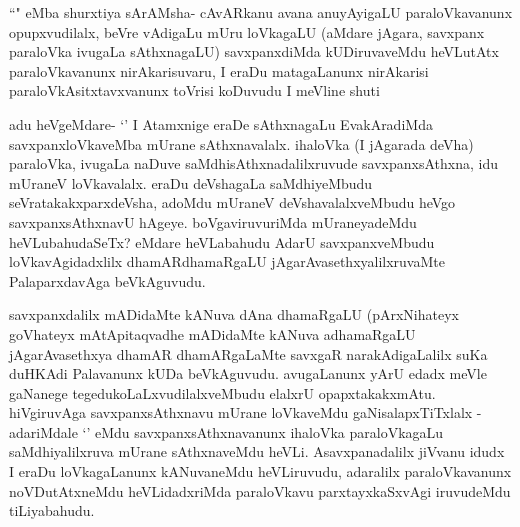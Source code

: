 
\begin{artha}
``\stext " eMba shurxtiya sArAMsha- cAvARkanu avana anuyAyigaLU paraloVkavanunx opupxvudilalx, beVre vAdigaLu mUru loVkagaLU (aMdare jAgara, savxpanx paraloVka ivugaLa sAthxnagaLU) savxpanxdiMda kUDiruvaveMdu heVLutAtx paraloVkavanunx nirAkarisuvaru, I eraDu matagaLanunx nirAkarisi paraloVkAsitxtavxvanunx toVrisi koDuvudu I meVline shuti
\end{artha}

\begin{artha}
adu heVgeMdare- `\stext ' I Atamxnige eraDe sAthxnagaLu EvakAradiMda savxpanxloVkaveMba mUrane sAthxnavalalx. ihaloVka (I jAgarada deVha) paraloVka, ivugaLa naDuve saMdhisAthxnadalilxruvude savxpanxsAthxna, idu mUraneV loVkavalalx. eraDu deVshagaLa saMdhiyeMbudu seVratakakxparxdeVsha, adoMdu mUraneV deVshavalalxveMbudu heVgo savxpanxsAthxnavU hAgeye. boVgaviruvuriMda mUraneyadeMdu heVLubahudaSeTx? eMdare heVLabahudu AdarU savxpanxveMbudu loVkavAgidadxlilx dhamARdhamaRgaLU jAgarAvasethxyalilxruvaMte PalaparxdavAga beVkAguvudu. 
\end{artha}

\begin{artha}%
savxpanxdalilx mADidaMte kANuva dAna dhamaRgaLU (pArxNihateyx goVhateyx mAtApitaqvadhe mADidaMte kANuva adhamaRgaLU jAgarAvasethxya dhamAR dhamARgaLaMte savxgaR narakAdigaLalilx suKa duHKAdi Palavanunx kUDa beVkAguvudu. avugaLanunx yArU edadx meVle gaNanege tegedukoLaLxvudilalxveMbudu elalxrU opapxtakakxmAtu. hiVgiruvAga savxpanxsAthxnavu mUrane loVkaveMdu gaNisalapxTiTxlalx - adariMdale `\stext ' eMdu savxpanxsAthxnavanunx ihaloVka paraloVkagaLu saMdhiyalilxruva mUrane sAthxnaveMdu heVLi. Asavxpanadalilx jiVvanu idudx I eraDu loVkagaLanunx kANuvaneMdu heVLiruvudu, adaralilx paraloVkavanunx noVDutAtxneMdu heVLidadxriMda paraloVkavu parxtayxkaSxvAgi iruvudeMdu tiLiyabahudu. 
\end{artha}

